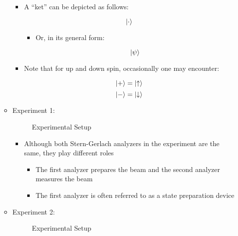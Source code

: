 \begin{itemize}
\begin{itemize}
\begin{itemize}
          \item A ``ket'' can be depicted as follows:

            $$\ket{\cdot}$$

            \begin{itemize}

              \item Or, in its general form:

            $$\ket{\psi}$$

            \end{itemize}

          \item Note that for up and down spin, occasionally one may encounter:

            $$\ket{+}=\ket{\uparrow}$$
            $$\ket{-}=\ket{\downarrow}$$

        \end{itemize}

      \item Experiment 1:

        \begin{figure}[H]
          \centering
          
          \caption{Experimental Setup}
          \label{fig:2}
        \end{figure}

        \begin{itemize}

          \item Although both Stern-Gerlach analyzers in the experiment are the same, they play different roles

            \begin{itemize}

              \item The first analyzer prepares the beam and the second analyzer measures the beam

              \item The first analyzer is often referred to as a state preparation device

            \end{itemize}

        \end{itemize}

      \item Experiment 2:

        \begin{figure}[H]
          \centering
          
          \caption{Experimental Setup}
          \label{fig:3}
        \end{figure}


\end{itemize}
\end{itemize}
